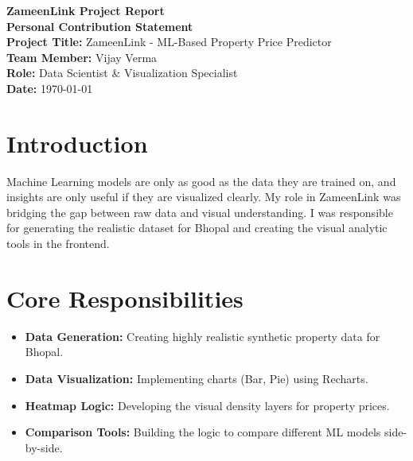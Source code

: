 \documentclass[12pt, a4paper]{article}
\begin{document}
\begin{titlepage}
    \centering
    \vspace*{2cm}
    {\Huge \textbf{ZameenLink Project Report}}\\[1.5cm]
    {\Large \textbf{Personal Contribution Statement}}\\[1cm]
    
    \textbf{Project Title:} ZameenLink - ML-Based Property Price Predictor\\
    \textbf{Team Member:} Vijay Verma\\
    \textbf{Role:} Data Scientist \& Visualization Specialist\\
    \textbf{Date:} \today\\[3cm]
    
    \begin{abstract}
        This report documents Vijay Verma's role in the ZameenLink project. It focuses on the synthetic data generation pipeline, data preprocessing, and the implementation of advanced visualization components like heatmaps and analytics charts.
    \end{abstract}
    
    \vfill
\end{titlepage}

\tableofcontents
\newpage

\section{Introduction}
Machine Learning models are only as good as the data they are trained on, and insights are only useful if they are visualized clearly. My role in ZameenLink was bridging the gap between raw data and visual understanding. I was responsible for generating the realistic dataset for Bhopal and creating the visual analytic tools in the frontend.

\section{Core Responsibilities}
\begin{itemize}
    \item \textbf{Data Generation:} Creating highly realistic synthetic property data for Bhopal.
    \item \textbf{Data Visualization:} Implementing charts (Bar, Pie) using Recharts.
    \item \textbf{Heatmap Logic:} Developing the visual density layers for property prices.
    \item \textbf{Comparison Tools:} Building the logic to compare different ML models side-by-side.
\end{itemize}
\end{document}
